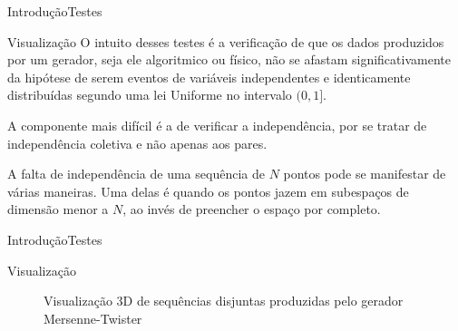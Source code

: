 \documentclass[10pt,xcolor={dvipsnames}]{beamer}
\begin{document}
\begin{frame}{Introdução}{Testes}
\pause
\begin{block}{Visualização}
	O intuito desses testes é a verificação de que os dados produzidos por um gerador, seja ele algoritmico ou físico, não se afastam significativamente da hipótese de serem eventos de variáveis independentes e identicamente distribuídas segundo uma lei Uniforme no intervalo $(0,1]$.
\pause	
	
	A componente mais difícil é a de verificar a independência, por se tratar de independência coletiva e não apenas aos pares.
\pause
	
	A falta de independência de uma sequência de $N$ pontos pode se manifestar de várias maneiras.
	Uma delas é quando os pontos jazem em subespaços de dimensão menor a $N$, ao invés de preencher o espaço por completo.
\end{block}
\end{frame}

\begin{frame}{Introdução}{Testes}
\begin{block}{Visualização}
	\begin{figure}[hbt]
		\centering
		\pause
		\caption{Visualização 3D de sequências disjuntas produzidas pelo gerador Mersenne-Twister}\label{fig:3DMT}
	\end{figure}
\end{block}
\end{frame}
\end{document}
